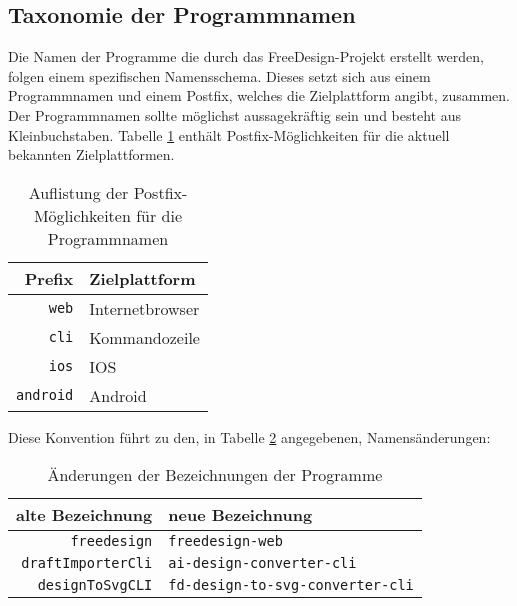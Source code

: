 \subsection{Taxonomie der Programmnamen}
Die Namen der Programme die durch das FreeDesign-Projekt erstellt werden, folgen einem spezifischen Namensschema. Dieses setzt sich aus einem Programmnamen und einem Postfix, welches die Zielplattform angibt, zusammen. Der Programmnamen sollte möglichst aussagekräftig sein und besteht aus Kleinbuchstaben. Tabelle \ref{table:postfix} enthält Postfix-Möglichkeiten für die aktuell bekannten Zielplattformen.

\begin{table}[H]
    \centering
    \caption{Auflistung der Postfix-Möglichkeiten für die Programmnamen}
    \label{table:postfix}
    \begin{tabular}{r|l}
        \textbf{Prefix} & \textbf{Zielplattform} \\
        \hline
        \lstinline|web| & Internetbrowser \\
        \lstinline|cli| & Kommandozeile \\
        \lstinline|ios| & IOS \\
        \lstinline|android| & Android 
    \end{tabular}
\end{table}

Diese Konvention führt zu den, in Tabelle \ref{table:Programmnamen} angegebenen, Namensänderungen: 
\begin{table}[H]
    \centering
    \caption{Änderungen der Bezeichnungen der Programme}
    \label{table:Programmnamen}
    \begin{tabular}{r|l}
        \textbf{alte Bezeichnung} & \textbf{neue Bezeichnung} \\
        \hline
        \lstinline|freedesign| & \lstinline|freedesign-web| \\
        \lstinline|draftImporterCli| & \lstinline|ai-design-converter-cli| \\
        \lstinline|designToSvgCLI| & \lstinline|fd-design-to-svg-converter-cli| 
    \end{tabular}
\end{table}
